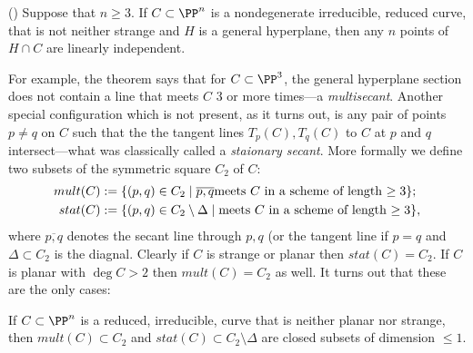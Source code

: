 \begin{theorem} \label{basic linear independence}(\cite[Lemma 1.1]{Rathmann})\label{linear general position}
Suppose that $n\geq 3$. If $C\subset \PP^n$ is a nondegenerate irreducible, reduced curve, that is not neither strange
and $H$ is a general hyperplane, then any $n$ points of $H\cap C$ are
linearly independent.
\end{theorem}

For example, the theorem says that for $C \subset \PP^3$, the general hyperplane section does not contain a line
that meets $C$ 3 or more times---a \emph{multisecant}. Another special configuration which is not present, as it turns out,
is any pair of points $p\neq q$ on $C$ such that the the tangent lines $T_p(C), T_q(C)$ to $C$ at $p$ and $q$ intersect---what was classically
called a \emph{staionary secant}. More formally we define two subsets of the symmetric square $C_2$ of $C$:
$$
\begin{aligned}
 mult(C) &:=\{(p,q) \in C_2 \mid \overline{p,q} \hbox{meets $C$ in a scheme of length $\geq 3$}\};\\
stat(C) &:= \{(p,q) \in C_2\setminus \Delta \mid  \hbox{meets $C$ in a scheme of length $\geq 3$}\},
\end{aligned}
$$
where $\overline{p,q}$ denotes the secant line through $p,q$ (or the tangent line if $p=q$ and $\Delta\subset C_2$
is the diagnal.
Clearly if $C$ is strange or planar then $stat(C) = C_2$. If $C$ is planar with $\deg C>2$ then $mult(C) = C_2$ as well.
It turns out that these are the only cases:

\begin{proposition}\label{mult and stat}
 If $C\subset \PP^n$ is a reduced, irreducible, curve that is neither planar nor strange, then $mult(C)\subset C_2$
 and $stat(C)\subset C_2\setminus \Delta$ are closed subsets of dimension $\leq 1$.
\end{proposition}

